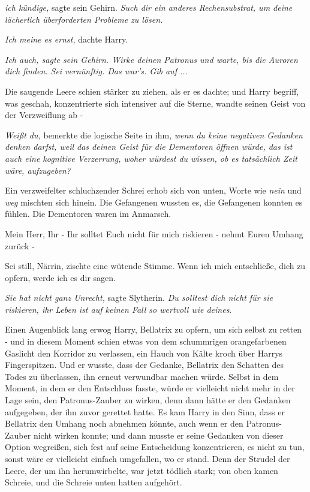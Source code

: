 \emph{ich kündige,} sagte sein Gehirn.\emph{ Such dir ein anderes
Rechensubstrat, um deine lächerlich überforderten Probleme zu lösen.}

\emph{Ich meine es ernst,} dachte Harry.

\emph{Ich auch, sagte sein Gehirn. Wirke deinen Patronus und warte, bis die
Auroren dich finden. Sei vernünftig. Das war's. Gib auf ...}

Die saugende Leere schien stärker zu ziehen, als er es dachte; und Harry
begriff, was geschah, konzentrierte sich intensiver auf die Sterne, wandte
seinen Geist von der Verzweiflung ab -

\emph{Weißt du,} bemerkte die logische Seite in ihm, \emph{wenn du keine
negativen Gedanken denken darfst, weil das deinen Geist für die Dementoren
öffnen würde, das ist auch eine kognitive Verzerrung, woher würdest du wissen,
ob es tatsächlich Zeit wäre, aufzugeben?}

Ein verzweifelter schluchzender Schrei erhob sich von unten, Worte wie \glqq{}
\emph{nein}\grqq{} und \glqq{}\emph{weg}\grqq{} mischten sich hinein. Die
Gefangenen wussten es, die Gefangenen konnten es fühlen. Die Dementoren waren im
Anmarsch.

\glqq{}Mein Herr, Ihr - Ihr solltet Euch nicht für mich riskieren - nehmt Euren
Umhang zurück -\grqq{}

\glqq{}Sei still, Närrin\grqq{}, zischte eine wütende Stimme. \glqq{}Wenn ich mich
entschließe, dich zu opfern, werde ich es dir sagen.\grqq{}

\emph{Sie hat nicht ganz Unrecht,} sagte Slytherin. \emph{Du solltest dich nicht
für sie riskieren, ihr Leben ist auf keinen Fall so wertvoll wie deines}.

Einen Augenblick lang erwog Harry, Bellatrix zu opfern, um sich selbst zu retten
- und in diesem Moment schien etwas von dem schummrigen orangefarbenen Gaslicht
den Korridor zu verlassen, ein Hauch von Kälte kroch über Harrys Fingerspitzen.
Und er wusste, dass der Gedanke, Bellatrix den Schatten des Todes zu überlassen,
ihn erneut verwundbar machen würde. Selbst in dem Moment, in dem er den
Entschluss fasste, würde er vielleicht nicht mehr in der Lage sein, den
Patronus-Zauber zu wirken, denn dann hätte er den Gedanken aufgegeben, der ihn
zuvor gerettet hatte. Es kam Harry in den Sinn, dass er Bellatrix den Umhang
noch abnehmen könnte, auch wenn er den Patronus-Zauber nicht wirken konnte; und
dann musste er seine Gedanken von dieser Option wegreißen, sich fest auf seine
Entscheidung konzentrieren, es nicht zu tun, sonst wäre er vielleicht einfach
umgefallen, wo er stand. Denn der Strudel der Leere, der um ihn herumwirbelte,
war jetzt tödlich stark; von oben kamen Schreie, und die Schreie unten hatten
aufgehört.

